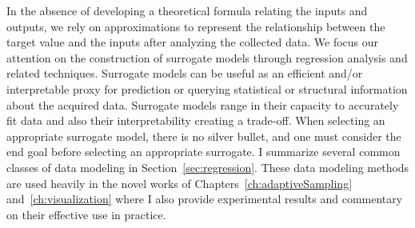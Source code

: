 In the absence of developing a theoretical formula relating the inputs and outputs, we rely on approximations to represent the relationship between the target value and the inputs after analyzing the collected data.
%
We focus our attention on the construction of surrogate models through regression analysis and related techniques.
%
Surrogate models can be useful as an efficient and/or interpretable proxy for prediction or querying statistical or structural information about the acquired data.
%
Surrogate models range in their capacity to accurately fit data and also their interpretability creating a trade-off.
%
When selecting an appropriate surrogate model, there is no silver bullet, and one must consider the end goal before selecting an appropriate surrogate.
%
I summarize several common classes of data modeling in Section~\ref{sec:regression}. These data modeling methods are used heavily in the novel works of Chapters~\ref{ch:adaptiveSampling} and~\ref{ch:visualization} where I also provide experimental results and commentary on their effective use in practice.

% 